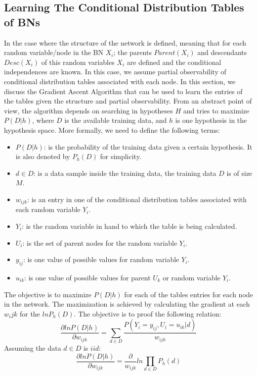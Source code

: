 \documentclass{article}
\begin{document}
\subsection{Learning The Conditional Distribution Tables of BNs}
In the case where the structure of the network is defined, meaning that for each random variable/node in the BN $X_i$; the parents $Parent(X_i)$ and descendants $Desc(X_i)$ of this random variables $X_i$ are defined and the conditional independences are known. In this case, we assume partial observability of conditional distribution tables associated with each node. In this section, we discuss the Gradient Ascent Algorithm that can be used to learn the entries of the tables given the structure and partial observability. From an abstract point of view, the algorithm depends on searching in hypotheses $H$ and tries to maximize $P(D|h)$, where $D$ is the available training data, and $h$ is one hypothesis in the hypothesis space. More formally, we need to define the following terms:
\begin{itemize}
\item $P(D|h)$: is the probability of the training data given a certain hypothesis. It is also denoted by $P_h (D)$ for simplicity.
\item $d \in D$: is a data sample inside the training data, the training data $D$ is of size $M$.
\item $w_{ijk}$: is an entry in one of the conditional distribution tables associated with each random variable $Y_i$.
\item $Y_{i}$: is the random variable in hand to which the table is being calculated.
\item $U_{i}$: is the set of parent nodes for the random variable $Y_i$.
\item $y_{ij}$: is one value of possible values for random variable $Y_i$.
\item $u_{ik}$: is one value of possible values for parent $U_k$ or random variable $Y_i$.
\end{itemize}
The objective is to maximize $P(D|h)$ for each of the tables entries for each node in the network. The maximization is achieved by calculating the gradient at each $w_ijk$ for the $lnP_h(D)$. The objective is to proof the following relation:
\begin{equation}
\frac{\partial ln P(D|h)}{\partial w_{ijk}} = \sum_{d \in D} \frac{P(Y_i = y_{ij}, U_i=u_{ik} | d)}{w_{ijk}}
\end{equation}
Assuming the data $d \in D $ is $iid$:
\begin{equation}
\frac{\partial ln P(D|h)}{\partial w_{ijk}} = \frac{\partial}{w_{ijk}} ln \prod_{d \in D} P_h(d)
\end{equation}
\end{document}

